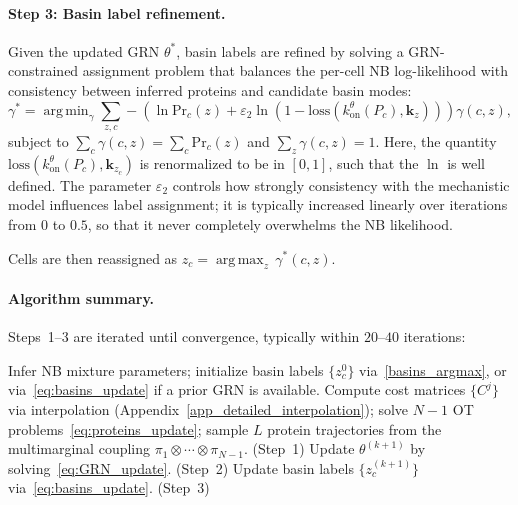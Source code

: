 \documentclass[a4paper, 11pt]{article}
\DeclareMathOperator*{\argmin}{arg\,min}
\DeclareMathOperator*{\argmax}{arg\,max}
\theoremstyle{plain}
\theoremstyle{remark}
\newcommand*{\firstreview}[1]{{\color{black}#1}}
\begin{document}
\paragraph{Step 3: Basin label refinement.}

Given the updated GRN $\theta^*$, basin labels are refined by solving a GRN-constrained assignment problem that balances the per-cell NB log-likelihood with consistency between inferred proteins and candidate basin modes:
\begin{equation}
\label{eq:basins_update}
\gamma^* = \argmin_{\gamma}\sum_{z,c}
      -\!\left(\ln\mathrm{Pr}_c(z)
       + \varepsilon_2\ln\!\left(1 - \mathrm{loss}\!\left(k^{\theta}_{\mathrm{on}}(P_c),\mathbf{k}_{z}\right)\right)\right)\gamma(c,z),
\end{equation}
subject to $\sum_c\gamma(c,z) = \sum_c\mathrm{Pr}_c(z)$ and $\sum_z\gamma(c,z) = 1$. Here, the quantity $\mathrm{loss}\!\left(k^{\theta}_{\mathrm{on}}(P_c),\mathbf{k}_{z_c}\right)$ is renormalized to be in $[0, 1]$, such that the $\ln$ is well defined. The parameter $\varepsilon_2$ controls how strongly consistency with the mechanistic model influences label assignment; it is typically increased linearly over iterations from $0$ to $0.5$, so that it never completely overwhelms the NB likelihood.

Cells are then reassigned as $z_c = \argmax_z\,\gamma^*(c,z)$.

\paragraph{Algorithm summary.}
Steps~1--3 are iterated until convergence, typically within $20$--$40$ iterations:

\begin{algorithm}[H]
\caption{CardamomOT}
\begin{algorithmic}[1]
\State Infer NB mixture parameters; initialize basin labels $\{z_c^0\}$ via~\eqref{basins_argmax}, or via~\eqref{eq:basins_update} if a prior GRN is available.
  \State Compute cost matrices $\{C^j\}$ via interpolation (Appendix~\ref{app_detailed_interpolation}); solve \firstreview{$N-1$} OT problems~\eqref{eq:proteins_update}; sample $L$ protein trajectories from the multimarginal coupling $\pi_1\otimes\cdots\otimes\pi_{N-1}$. \hfill (Step~1)
  \State Update $\theta^{(k+1)}$ by solving~\eqref{eq:GRN_update}. \hfill (Step~2)
  \State Update basin labels $\{z_c^{(k+1)}\}$ via~\eqref{eq:basins_update}. \hfill (Step~3)
\EndFor
\end{algorithmic}
\end{algorithm}
\end{document}
